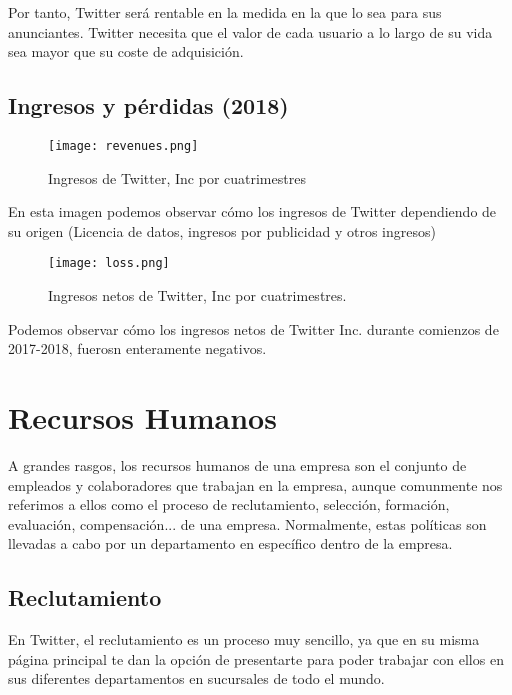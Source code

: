 Por tanto, Twitter será rentable en la medida en la que lo sea para sus anunciantes.
Twitter necesita que el valor de cada usuario a lo largo de su vida sea mayor que su coste de adquisición.

\newpage

\subsection{Ingresos y pérdidas (2018)}

\begin{figure}[!htb]
\centering
\texttt{[image: revenues.png]}
\caption{\label{fig:frog}Ingresos de Twitter, Inc por cuatrimestres}
\end{figure}

En esta imagen podemos observar cómo los ingresos de Twitter dependiendo de su origen (Licencia de datos, ingresos por publicidad y otros ingresos)


\begin{figure}[!htb]
\centering
\texttt{[image: loss.png]}
\caption{\label{fig:frog}Ingresos netos de Twitter, Inc por cuatrimestres.}
\end{figure}


Podemos observar cómo los ingresos netos de Twitter Inc. durante comienzos de 2017-2018, fuerosn enteramente negativos.



\section{Recursos Humanos}

A grandes rasgos, los recursos humanos de una empresa son el conjunto de empleados y colaboradores que
trabajan en la empresa, aunque comunmente nos referimos a ellos como el proceso de reclutamiento, selección, formación, evaluación, compensación... de una empresa. Normalmente, estas políticas son llevadas a cabo por un departamento en específico dentro de la empresa.

\subsection{Reclutamiento}

En Twitter, el reclutamiento es un proceso muy sencillo, ya que en su misma página principal te dan la opción de presentarte para poder trabajar con ellos en sus diferentes departamentos en sucursales de todo el mundo.

